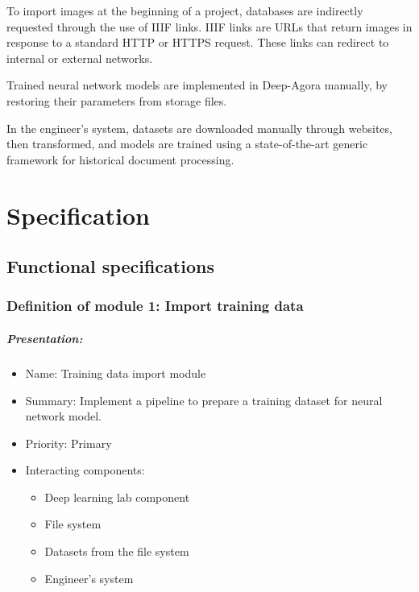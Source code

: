 \documentclass{polytech/polytech}
\numberwithin{figure}{chapter}
\begin{document}
\begin{appendix}
To import images at the beginning of a project, databases are indirectly requested through the use of IIIF links.
IIIF links are URLs that return images in response to a standard HTTP or HTTPS request.
These links can redirect to internal or external networks.

Trained neural network models are implemented in Deep-Agora manually, by restoring their parameters from storage files.

In the engineer’s system, datasets are downloaded manually through websites, then transformed, and models are trained using a state-of-the-art generic framework for historical document processing.



\chapter{Specification}

\section{Functional specifications}

\subsection{Definition of module 1: Import training data}

\paragraph{Presentation:}
 
\begin{itemize}
    \item Name: Training data import module
    \item Summary: Implement a pipeline to prepare a training dataset for neural network model.
    \item Priority: Primary
    \item Interacting components:
    \begin{itemize}
        \item Deep learning lab component
        \item File system
        \item Datasets from the file system
        \item Engineer’s system
    \end{itemize}
\end{itemize}


\end{appendix}
\end{document}
